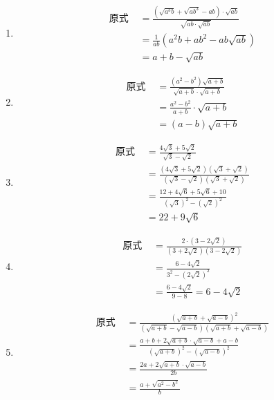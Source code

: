 \begin{solution}
\begin{enumerate}
    \item \[\begin{split}
\text{原式 }&=\frac{\left(\sqrt{a^{3} b}+\sqrt{a b^{3}}-a b\right) \cdot \sqrt{a b}}{\sqrt{a b \cdot \sqrt{a b}}}\\
&=\frac{1}{a b}\left(a^{2} b+a b^{2}-a b \sqrt{a b}\right)\\
&=a+b-\sqrt{ab}
    \end{split}\]
    \item \[\begin{split}
\text{原式 }&= \frac{(a^2-b^2)\sqrt{a+b}}{\sqrt{a+b}\cdot \sqrt{a+b}}   \\
&= \frac{a^2-b^2}{a+b}\cdot \sqrt{a+b}  \\
&=  (a-b)\sqrt{a+b}
    \end{split}\]
    \item \[\begin{split}
\text{原式 }&= \frac{4\sqrt{3}+5\sqrt{2}}{\sqrt{3}-\sqrt{2}}   \\
&= \frac{\left(4\sqrt{3}+5\sqrt{2}\right)\left(\sqrt{3}+\sqrt{2}\right)}{\left(\sqrt{3}-\sqrt{2}\right)\left(\sqrt{3}+\sqrt{2}\right)}  \\
&=  \frac{12+4\sqrt{6}+5\sqrt{6}+10}{(\sqrt{3})^2-(\sqrt{2})^2}\\
&=22+9\sqrt{6}
    \end{split}\]
        \item \[\begin{split}
\text{原式 }&= \frac{2\cdot (3-2\sqrt{2})}{(3+2\sqrt{2})(3-2\sqrt{2})}   \\
&= \frac{6-4\sqrt{2}}{3^2-(2\sqrt{2})^2}  \\
&=  \frac{6-4\sqrt{2}}{9-8}=6-4\sqrt{2}
    \end{split}\]
            \item \[\begin{split}
\text{原式 }&= \frac{(\sqrt{a+b}+\sqrt{a-b})^2}{(\sqrt{a+b}-\sqrt{a-b})(\sqrt{a+b}+\sqrt{a-b})}   \\
&= \frac{a+b+2\sqrt{a+b}\cdot \sqrt{a-b}+a-b}{(\sqrt{a+b})^2-(\sqrt{a-b})^2}  \\
&= \frac{2a+2\sqrt{a+b}\cdot \sqrt{a-b}}{2b}\\
&=\frac{a+\sqrt{a^2-b^2}}{b} 
    \end{split}\]
\end{enumerate}
\end{solution}

